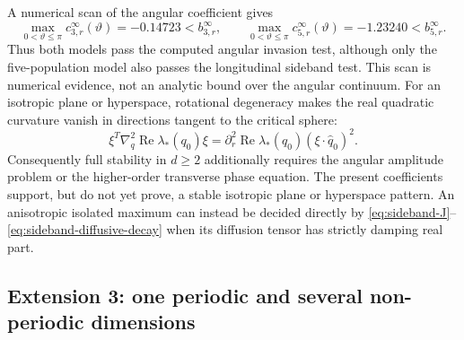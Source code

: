 \documentclass[11pt]{article}
\newcommand{\RePart}{\operatorname{Re}}
\begin{document}
A numerical scan of the angular coefficient gives
\begin{equation}
 \max_{0<\vartheta\leq\pi}c_{3,r}^\infty(\vartheta)
 =-0.14723<b_{3,r}^\infty,
 \qquad
 \max_{0<\vartheta\leq\pi}c_{5,r}^\infty(\vartheta)
 =-1.23240<b_{5,r}^\infty.
 \label{eq:angular-scan-results}
\end{equation}
Thus both models pass the computed angular invasion test, although only the
five-population model also passes the longitudinal sideband test.  This scan
is numerical evidence, not an analytic bound over the angular continuum.
For an isotropic plane or hyperspace, rotational degeneracy makes the real
quadratic curvature vanish in directions tangent to the critical sphere:
\begin{equation}
 \xi^T\nabla_q^2\RePart\lambda_*(q_0)\xi
 =\partial_r^2\RePart\lambda_*(q_0)
 (\xi\cdot\widehat q_0)^2.
 \label{eq:isotropic-tangential-degeneracy}
\end{equation}
Consequently full stability in $d\geq2$ additionally requires the angular
amplitude problem or the higher-order transverse phase equation.  The
present coefficients support, but do not yet prove, a stable isotropic
plane or hyperspace pattern.  An anisotropic isolated maximum can instead be
decided directly by \eqref{eq:sideband-J}--
\eqref{eq:sideband-diffusive-decay} when its diffusion tensor has strictly
damping real part.

\subsection{Extension 3: one periodic and several non-periodic dimensions}
\label{sec:mixed-domain}
\end{document}

